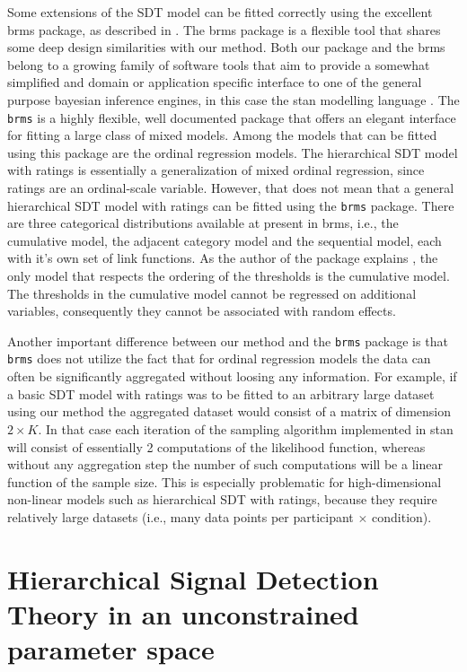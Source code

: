 \documentclass[a4paper,man,apacite,floatsintext]{apa6}
\newcommand{\code}[1]{\texttt{#1}}
\begin{document}
Some extensions of the SDT model can be fitted correctly using the
excellent brms package, as described in . The
brms package is a flexible tool that shares some deep design
similarities with our method. Both our package and the brms belong to
a growing family of software tools that aim to provide a somewhat
simplified and domain or application specific interface to one of the
general purpose bayesian inference engines, in this case the stan
modelling language \cite{carpenter2016stan}. The \code{brms} is a
highly flexible, well documented package that offers an elegant
interface for fitting a large class of mixed models. Among the models
that can be fitted using this package are the ordinal regression
models. The hierarchical SDT model with ratings is essentially a
generalization of mixed ordinal regression, since ratings are an
ordinal-scale variable. However, that does not mean that a general
hierarchical SDT model with ratings can be fitted using the
\code{brms} package. There are three categorical distributions
available at present in brms, i.e., the cumulative model, the adjacent
category model and the sequential model, each with it's own set of
link functions. As the author of the package explains
\cite{burkner2017brms}, the only model that respects the ordering of
the thresholds is the cumulative model. The thresholds in the
cumulative model cannot be regressed on additional variables,
consequently they cannot be associated with random effects.

Another important difference between our method and the \code{brms}
package is that \code{brms} does not utilize the fact that for ordinal
regression models the data can often be significantly aggregated
without loosing any information. For example, if a basic SDT model
with ratings was to be fitted to an arbitrary large dataset using our
method the aggregated dataset would consist of a matrix of dimension
$2\times K$. In that case each iteration of the sampling algorithm
implemented in stan will consist of essentially 2 computations of the
likelihood function, whereas without any aggregation step the number
of such computations will be a linear function of the sample
size. This is especially problematic for high-dimensional non-linear
models such as hierarchical SDT with ratings, because they require
relatively large datasets (i.e., many data points per participant
$\times$ condition).

\section{Hierarchical Signal Detection Theory in an unconstrained
  parameter space}
\end{document}
